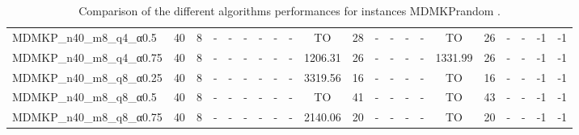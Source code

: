 \begin{sidewaystable}[!ht]
{\begin{tabular}{lcccccccccccccccccccc}
MDMKP\_n40\_m8\_q4\_α0.5 & 40 & 8 &  - &  - &  - &  - &  - &  - & TO & 28 &  - &  - &  - &  - & TO & 26 &  - &  - & -1 & -1 \\
MDMKP\_n40\_m8\_q4\_α0.75 & 40 & 8 &  - &  - &  - &  - &  - &  - &  \textcolor{blue2}{1206.31} & 26 &  - &  - &  - &  - & 1331.99 & 26 &  - &  - & -1 & -1 \\
MDMKP\_n40\_m8\_q8\_α0.25 & 40 & 8 &  - &  - &  - &  - &  - &  - &  \textcolor{blue2}{3319.56} & 16 &  - &  - &  - &  - & TO & 16 &  - &  - & -1 & -1 \\
MDMKP\_n40\_m8\_q8\_α0.5 & 40 & 8 &  - &  - &  - &  - &  - &  - & TO & 41 &  - &  - &  - &  - & TO & 43 &  - &  - & -1 & -1 \\
MDMKP\_n40\_m8\_q8\_α0.75 & 40 & 8 &  - &  - &  - &  - &  - &  - &  \textcolor{blue2}{2140.06} & 20 &  - &  - &  - &  - & TO & 20 &  - &  - & -1 & -1 \\
\bottomrule
\end{tabular}
}%
\caption{Comparison of the different algorithms performances for instances MDMKPrandom .}
\label{tab:table_compare_MDMKPrandom }
\end{sidewaystable}
